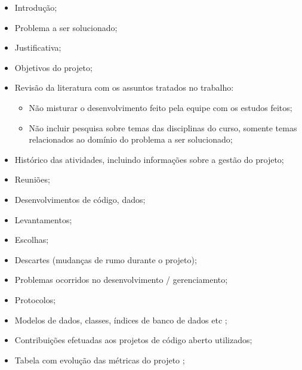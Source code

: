 \begin{itemize}
    \item Introdução;
    
    \item Problema a ser solucionado;
    
    \item Justificativa;
    
    \item Objetivos do projeto;
    
    \item Revisão da literatura com os assuntos tratados no trabalho:
        \begin{itemize}
            \item Não misturar o desenvolvimento feito pela equipe com os estudos feitos;
            
            \item Não incluir pesquisa sobre temas das disciplinas do curso, somente temas relacionados ao domínio do problema a ser solucionado;
        \end{itemize}
        
    \item Histórico das atividades, incluindo informações sobre a gestão do projeto;
    
    \item Reuniões;
    
    \item Desenvolvimentos de código, dados;
    
    \item Levantamentos;

    \item Escolhas;
    
    \item Descartes (mudanças de rumo durante o projeto);

    \item Problemas ocorridos no desenvolvimento / gerenciamento;
    
    \item Protocolos;
    
    \item Modelos de dados, classes, índices de banco de dados etc ;
    
    \item Contribuições efetuadas aos projetos de código aberto utilizados;
    
    \item Tabela com evolução das métricas do projeto ;
    

\end{itemize}
